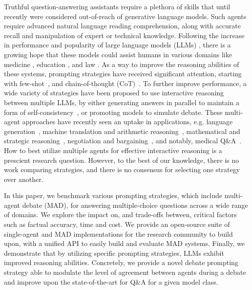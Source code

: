 \documentclass{article}  %
\newcommand{\hlc}[2]{{\color{#1}#2}}
\newcommand{\ins}[1]{\hlc{blue}{#1}}
\begin{document}
Truthful question-answering assistants require a plethora of skills that until recently were considered out-of-reach of generative language models. Such agents require advanced natural language reading comprehension, along with accurate recall and manipulation of expert or technical knowledge. Following the increase in performance and popularity of large language models (LLMs) \citep{brown2020language, openAI2023gpt4}, there is a growing hope that these models could assist humans in various domains like medicine \citep{lievin2022can, han2023medalpaca, nori2023medprompt, wang2023clinicalgpt, singhal2023medpalm}, education \citep{pardos2023learning, kumar2024learning}, and law \citep{lai2023law}.
As a way to improve the reasoning abilities of these systems, prompting strategies have received significant attention, starting with few-shot~\citep{brown2020language}, and chain-of-thought (CoT)~\citep{wei2022chain, kojima2022large}. 
To further improve performance, a wide variety of strategies have been proposed to use interactive reasoning between multiple LLMs, by either generating answers in parallel to maintain a form of self-consistency~\citep{wang2022self}, or promoting models to simulate debate. 
These multi-agent approaches have recently seen an uptake in applications, e.g. language generation~\citep{chan2023chateval}, 
machine translation and arithmetic reasoning~\citep{liang2023encouraging}, mathematical and strategic reasoning~\citep{du2023improving},
negotiation and bargaining~\citep{fu2023improving},
and notably, medical Q\&A~\citep{anil2023palm, singhal2023medpalm, nori2023medprompt}.
%
How to best utilize multiple agents for effective interactive reasoning is a prescient research question. However, to the best of our knowledge, there is no work comparing strategies, and there is no consensus for selecting one strategy over another. 

In this paper, we benchmark various prompting strategies, which include multi-agent debate (MAD), for answering multiple-choice questions across a wide range of domains. We explore the impact on, and trade-offs between, critical factors such as factual accuracy, time and cost.  
We provide an open-source suite of single-agent and MAD implementations for the research community to build upon, with a unified API to easily build and evaluate MAD systems. Finally, we demonstrate that by utilizing specific prompting strategies, LLMs exhibit improved reasoning abilities. Concretely, we provide a novel debate prompting strategy able to modulate the level of agreement between agents during a debate and improve upon the state-of-the-art for Q\&A for a given model class. 
\end{document}

